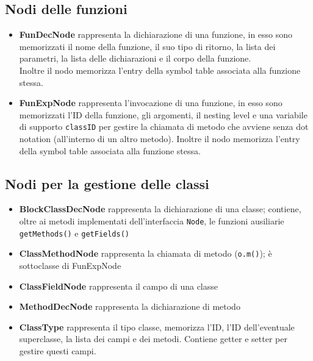 \documentclass[a4paper]{article}   %
\begin{document}

\subsection{Nodi delle funzioni}
\begin{itemize}
  \item \textbf{FunDecNode} rappresenta la dichiarazione di una funzione, in esso sono memorizzati
  il nome della funzione, il suo tipo di ritorno, la lista dei parametri, la lista delle dichiarazioni e il corpo della funzione.\\
  Inoltre il nodo memorizza l'entry della symbol table associata alla funzione stessa.
  \item \textbf{FunExpNode} rappresenta l'invocazione di una funzione, in esso sono memorizzati l'ID della funzione, gli argomenti, il nesting level e una variabile di supporto \lstinline|classID| per gestire la chiamata di metodo che avviene senza dot notation (all'interno di un altro metodo). Inoltre il nodo memorizza l'entry della symbol table associata alla funzione stessa.
\end{itemize}

\subsection{Nodi per la gestione delle classi}
\begin{itemize}
  \item \textbf{BlockClassDecNode} rappresenta la dichiarazione di una classe; contiene, oltre ai metodi implementati dell'interfaccia \lstinline|Node|, le funzioni ausiliarie \lstinline|getMethods()| e \lstinline|getFields()|
  \item \textbf{ClassMethodNode} rappresenta la chiamata di metodo (\lstinline|o.m()|); è sottoclasse di FunExpNode
  \item \textbf{ClassFieldNode} rappresenta il campo di una classe
  \item \textbf{MethodDecNode} rappresenta la dichiarazione di metodo
  \item \textbf{ClassType} rappresenta il tipo classe, memorizza l'ID, l'ID dell'eventuale superclasse, la lista dei campi e dei metodi. Contiene getter e setter per gestire questi campi.
\end{itemize}
\end{document}
